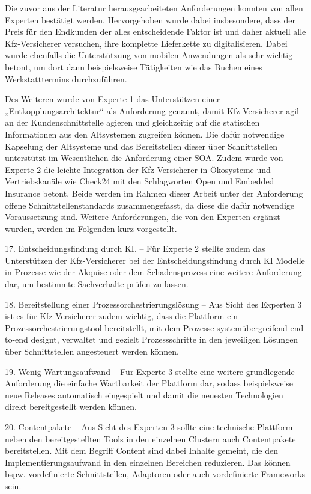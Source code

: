 Die zuvor aus der Literatur herausgearbeiteten Anforderungen konnten von allen Experten bestätigt werden. Hervorgehoben wurde dabei insbesondere, dass der Preis für den Endkunden der alles entscheidende Faktor ist und daher aktuell alle Kfz-Versicherer versuchen, ihre komplette Lieferkette zu digitalisieren. Dabei wurde ebenfalls die Unterstützung von mobilen Anwendungen als sehr wichtig betont, um dort dann beispielsweise Tätigkeiten wie das Buchen eines Werkstatttermins durchzuführen. 

Des Weiteren wurde von Experte 1 das Unterstützen einer „Entkopplungsarchitektur“ als Anforderung genannt, damit Kfz-Versicherer agil an der Kundenschnittstelle agieren und gleichzeitig auf die statischen Informationen aus den Altsystemen zugreifen können. Die dafür notwendige Kapselung der Altsysteme und das Bereitstellen dieser über Schnittstellen unterstützt im Wesentlichen die Anforderung einer SOA. Zudem wurde von Experte 2 die leichte Integration der Kfz-Versicherer in Ökosysteme und Vertriebskanäle wie Check24 mit den Schlagworten Open und Embedded Insurance betont. Beide werden im Rahmen dieser Arbeit unter der Anforderung offene Schnittstellenstandards zusammengefasst, da diese die dafür notwendige Voraussetzung sind. Weitere Anforderungen, die von den Experten ergänzt wurden, werden im Folgenden kurz vorgestellt.

17. Entscheidungsfindung durch KI. – Für Experte 2 stellte zudem das Unterstützen der Kfz-Versicherer bei der Entscheidungsfindung durch KI Modelle in Prozesse wie der Akquise oder dem Schadensprozess eine weitere Anforderung dar, um bestimmte Sachverhalte prüfen zu lassen.

18. Bereitstellung einer Prozessorchestrierungslösung – Aus Sicht des Experten 3 ist es für Kfz-Versicherer zudem wichtig, dass die Plattform ein Prozessorchestrierungstool bereitstellt, mit dem Prozesse systemübergreifend end-to-end designt, verwaltet und gezielt Prozessschritte in den jeweiligen Lösungen über Schnittstellen angesteuert werden können. 

19. Wenig Wartungsaufwand – Für Experte 3 stellte eine weitere grundlegende Anforderung die einfache Wartbarkeit der Plattform dar, sodass beispielsweise neue Releases automatisch eingespielt und damit die neuesten Technologien direkt bereitgestellt werden können.

20. Contentpakete – Aus Sicht des Experten 3 sollte eine technische Plattform neben den bereitgestellten Tools in den einzelnen Clustern auch Contentpakete bereitstellen. Mit dem Begriff Content sind dabei Inhalte gemeint, die den Implementierungsaufwand in den einzelnen Bereichen reduzieren. Das können bspw. vordefinierte Schnittstellen, Adaptoren oder auch vordefinierte Frameworks sein. 

